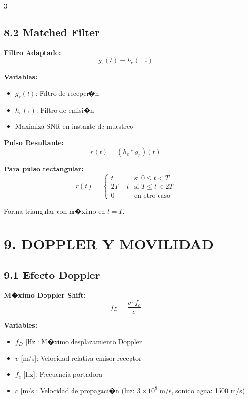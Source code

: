 ﻿\documentclass[8pt,a4paper]{article}
\begin{document}
\begin{multicols}{3}
\subsection*{\small 8.2 Matched Filter}
\vspace{-2mm}

\textbf{Filtro Adaptado:}
\[
g_r(t) = h_e(-t)
\]

\textbf{Variables:}
\begin{itemize}[leftmargin=*,itemsep=0pt]
    \item $g_r(t)$: Filtro de recepci�n
    \item $h_e(t)$: Filtro de emisi�n
    \item Maximiza SNR en instante de muestreo
\end{itemize}

\textbf{Pulso Resultante:}
\[
r(t) = (h_e * g_r)(t)
\]

\textbf{Para pulso rectangular:}
\[
r(t) = \begin{cases}
t & \text{si } 0 \leq t < T \\
2T - t & \text{si } T \leq t < 2T \\
0 & \text{en otro caso}
\end{cases}
\]

Forma triangular con m�ximo en $t = T$.

\vspace{-2mm}
\section*{\color{sectioncolor}\normalsize 9. DOPPLER Y MOVILIDAD}
\vspace{-3mm}

\subsection*{\small 9.1 Efecto Doppler}
\vspace{-2mm}

\textbf{M�ximo Doppler Shift:}
\[
f_D = \frac{v \cdot f_c}{c}
\]

\textbf{Variables:}
\begin{itemize}[leftmargin=*,itemsep=0pt]
    \item $f_D$ [Hz]: M�ximo desplazamiento Doppler
    \item $v$ [m/s]: Velocidad relativa emisor-receptor
    \item $f_c$ [Hz]: Frecuencia portadora
    \item $c$ [m/s]: Velocidad de propagaci�n (luz: $3 \times 10^8$ m/s, sonido agua: 1500 m/s)
\end{itemize}


\end{multicols}
\end{document}
